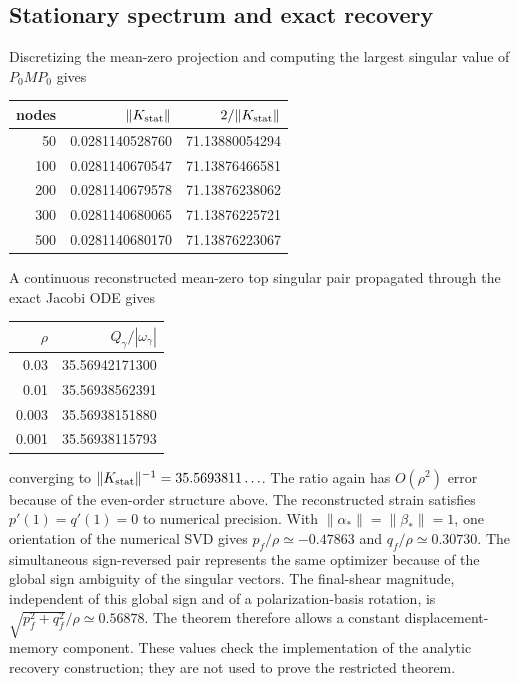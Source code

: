 \subsection{Stationary spectrum and exact recovery}
Discretizing the mean-zero projection and computing the largest singular value of $P_0MP_0$ gives
\begin{center}
\begin{tabular}{rrr}
\toprule
nodes&$\|K_{\rm stat}\|$&$2/\|K_{\rm stat}\|$\\
\midrule
50&0.0281140528760&71.13880054294\\
100&0.0281140670547&71.13876466581\\
200&0.0281140679578&71.13876238062\\
300&0.0281140680065&71.13876225721\\
500&0.0281140680170&71.13876223067\\
\bottomrule
\end{tabular}
\end{center}
A continuous reconstructed mean-zero top singular pair propagated through the exact Jacobi ODE gives
\begin{center}
\begin{tabular}{rr}
\toprule
$\rho$ & $Q_\gamma/|\omega_\gamma|$\\
\midrule
0.03&35.56942171300\\
0.01&35.56938562391\\
0.003&35.56938151880\\
0.001&35.56938115793\\
\bottomrule
\end{tabular}
\end{center}
converging to $\|K_{\rm stat}\|^{-1}=35.5693811\ldots$. The ratio again has $O(\rho^2)$ error because of the even-order structure above. The reconstructed strain satisfies $p'(1)=q'(1)=0$ to numerical precision. With $\|\alpha_*\|=\|\beta_*\|=1$, one orientation of the numerical SVD gives $p_f/\rho\simeq-0.47863$ and $q_f/\rho\simeq0.30730$. The simultaneous sign-reversed pair represents the same optimizer because of the global sign ambiguity of the singular vectors. The final-shear magnitude, independent of this global sign and of a polarization-basis rotation, is $\sqrt{p_f^2+q_f^2}/\rho\simeq0.56878$. The theorem therefore allows a constant displacement-memory component. These values check the implementation of the analytic recovery construction; they are not used to prove the restricted theorem.

